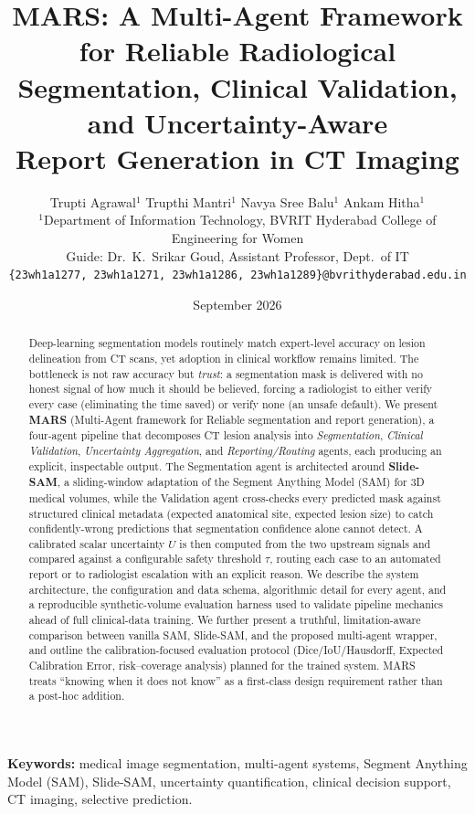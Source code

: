 \documentclass[11pt,a4paper]{article}
\title{\textbf{\Large MARS: A Multi-Agent Framework for Reliable Radiological\\
Segmentation, Clinical Validation, and Uncertainty-Aware\\
Report Generation in CT Imaging}}
\author{
Trupti Agrawal$^{1}$ \quad Trupthi Mantri$^{1}$ \quad Navya Sree Balu$^{1}$ \quad Ankam Hitha$^{1}$\\[4pt]
\small $^{1}$Department of Information Technology, BVRIT Hyderabad College of Engineering for Women\\
\small Guide: Dr.\ K.\ Srikar Goud, Assistant Professor, Dept.\ of IT\\
\small\texttt{\{23wh1a1277, 23wh1a1271, 23wh1a1286, 23wh1a1289\}@bvrithyderabad.edu.in}
}
\date{September 2026}
\begin{document}
\maketitle

\begin{abstract}
\noindent
Deep-learning segmentation models routinely match expert-level accuracy on lesion delineation from CT scans, yet adoption in clinical workflow remains limited. The bottleneck is not raw accuracy but \emph{trust}: a segmentation mask is delivered with no honest signal of how much it should be believed, forcing a radiologist to either verify every case (eliminating the time saved) or verify none (an unsafe default). We present \textbf{MARS} (Multi-Agent framework for Reliable segmentation and report generation), a four-agent pipeline that decomposes CT lesion analysis into \emph{Segmentation}, \emph{Clinical Validation}, \emph{Uncertainty Aggregation}, and \emph{Reporting/Routing} agents, each producing an explicit, inspectable output. The Segmentation agent is architected around \textbf{Slide-SAM}, a sliding-window adaptation of the Segment Anything Model (SAM) for 3D medical volumes, while the Validation agent cross-checks every predicted mask against structured clinical metadata (expected anatomical site, expected lesion size) to catch confidently-wrong predictions that segmentation confidence alone cannot detect. A calibrated scalar uncertainty $U$ is then computed from the two upstream signals and compared against a configurable safety threshold $\tau$, routing each case to an automated report or to radiologist escalation with an explicit reason. We describe the system architecture, the configuration and data schema, algorithmic detail for every agent, and a reproducible synthetic-volume evaluation harness used to validate pipeline mechanics ahead of full clinical-data training. We further present a truthful, limitation-aware comparison between vanilla SAM, Slide-SAM, and the proposed multi-agent wrapper, and outline the calibration-focused evaluation protocol (Dice/IoU/Hausdorff, Expected Calibration Error, risk--coverage analysis) planned for the trained system. MARS treats ``knowing when it does not know'' as a first-class design requirement rather than a post-hoc addition.
\end{abstract}

\noindent\textbf{Keywords:} medical image segmentation, multi-agent systems, Segment Anything Model (SAM), Slide-SAM, uncertainty quantification, clinical decision support, CT imaging, selective prediction.
\end{document}
